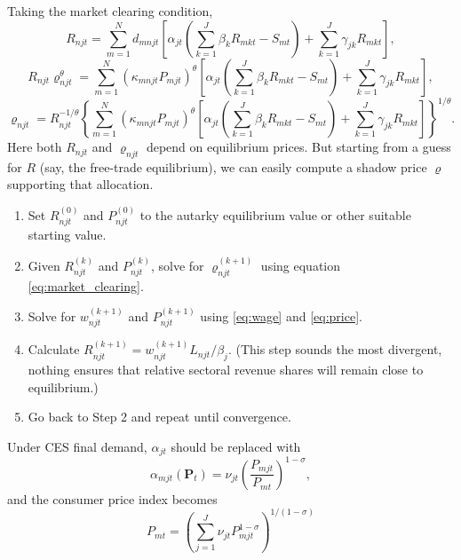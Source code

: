\documentclass[12pt]{article}
\begin{document}
Taking the market clearing condition,
\begin{equation}\label{eq5}
	R_{njt} = \sum_{m=1}^N
		d_{mnjt}
		\left[
			\alpha_{jt}
			\left(
				\sum_{k=1}^J\beta_k R_{mkt} - S_{mt}
			\right)
			+ \sum_{k=1}^J\gamma_{jk}R_{mkt}
		\right],
\end{equation}
\[
	R_{njt}\varrho_{njt}^{\theta} = \sum_{m=1}^N
		(\kappa_{mnjt} P_{mjt})^{\theta}
		\left[
			\alpha_{jt}
			\left(
				\sum_{k=1}^J\beta_k R_{mkt} - S_{mt}
			\right)
			+ \sum_{k=1}^J\gamma_{jk}R_{mkt}
		\right],
\]
\begin{equation}\label{eq:market_clearing}
	\varrho_{njt} = R_{njt}^{-1/\theta}
	\left\{
	\sum_{m=1}^N
		(\kappa_{mnjt} P_{mjt})^{\theta}
		\left[
			\alpha_{jt}
			\left(
				\sum_{k=1}^J\beta_k R_{mkt} - S_{mt}
			\right)
			+ \sum_{k=1}^J\gamma_{jk}R_{mkt}
		\right]
	\right\}^{1/\theta}.
\end{equation}
Here both $R_{njt}$ and $\varrho_{njt}$ depend on equilibrium prices. But starting from a guess for $R$ (say, the free-trade equilibrium), we can easily compute a shadow price $\varrho$ supporting that allocation. 
\begin{enumerate}
	\item Set $R_{njt}^{(0)}$ and $P_{njt}^{(0)}$ to the autarky equilibrium value or other suitable starting value.
	\item Given $R_{njt}^{(k)}$ and $P_{njt}^{(k)}$, solve for $\varrho_{njt}^{(k+1)}$ using equation \eqref{eq:market_clearing}.
	\item Solve for $w_{njt}^{(k+1)}$ and $P_{njt}^{(k+1)}$ using \eqref{eq:wage} and \eqref{eq:price}.
	\item Calculate $R_{njt}^{(k+1)} = w_{njt}^{(k+1)}L_{njt}/\beta_j$. (This step sounds the most divergent, nothing ensures that relative sectoral revenue shares will remain close to equilibrium.)
	\item Go back to Step 2 and repeat until convergence.
\end{enumerate}

Under CES final demand, $\alpha_{jt}$ should be replaced with
\[
\alpha_{mjt}(\mathbf P_t) = 
 \nu_{jt}
 \left(
 	\frac
 		{P_{mjt}}
 		{P_{mt}}
 \right)^{1-\sigma},
\]
and the consumer price index becomes
\[
P_{mt} = \left(
	\sum_{j=1}^J
		\nu_{jt} P_{mjt}^{1-\sigma}
	\right)^{1/(1-\sigma)}
\]
\end{document}
